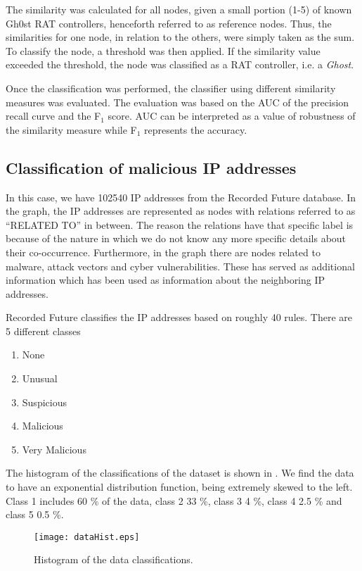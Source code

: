 The similarity was calculated for all nodes, given a small portion (1-5) of known Gh0st RAT controllers, henceforth referred to as reference nodes. Thus, the similarities for one node, in relation to the others, were simply taken as the sum. To classify the node, a threshold was then applied. If the similarity value exceeded the threshold, the node was classified as a RAT controller, i.e. a \textit{Ghost}.

Once the classification was performed, the classifier using different similarity measures was evaluated. The evaluation was based on the AUC of the precision recall curve and the F$_1$ score. AUC can be interpreted as a value of robustness of the similarity measure while F$_1$ represents the accuracy.

\subsection{Classification of malicious IP addresses}
In this case, we have 102540 IP addresses from the Recorded Future database. In the graph, the IP addresses are represented as nodes with relations referred to as ``RELATED TO'' in between. The reason the relations have that specific label is because of the nature in which we do not know any more specific details about their co-occurrence. Furthermore, in the graph there are nodes related to malware, attack vectors and cyber vulnerabilities. These has served as additional information which has been used as information about the neighboring IP addresses.

Recorded Future classifies the IP addresses based on roughly 40 rules. There are 5 different classes
\begin{enumerate}
    \item None
    \item Unusual
    \item Suspicious
    \item Malicious
    \item Very Malicious
\end{enumerate}

The histogram of the classifications of the dataset is shown in . We find the data to have an exponential distribution function, being extremely skewed to the left. Class 1 includes 60 \% of the data, class 2 33 \%, class 3 4 \%, class 4 2.5 \% and class 5 0.5 \%. 

\begin{figure}[h!]
    \centering
    \texttt{[image: dataHist.eps]}
    \caption{Histogram of the data classifications.}
    \label{hist}
\end{figure}


